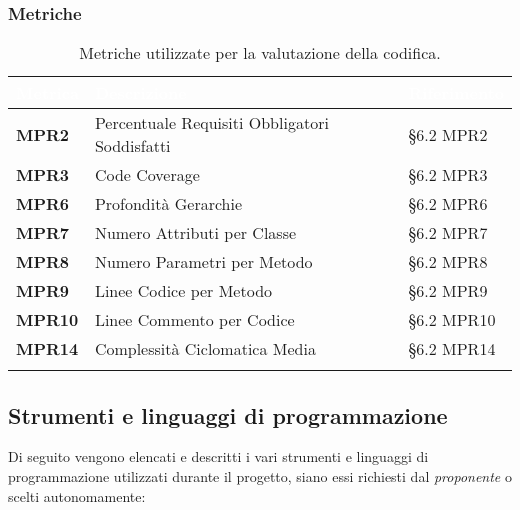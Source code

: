 \subsubsection{Metriche}
\setlength{\freewidth}{\dimexpr\textwidth-0\tabcolsep}
\renewcommand{\arraystretch}{1.5}
\setlength{\aboverulesep}{0pt}
\setlength{\belowrulesep}{0pt}
\begin{longtable}{L{.22\freewidth} L{.4\freewidth} L{.2\freewidth}}
	\toprule
	\textcolor{white}{\textbf{Metrica}}&
	\textcolor{white}{\textbf{Descrizione}}&	
	\textcolor{white}{\textbf{Riferimento}}\\
	\toprule
	\endhead
	
	\textbf{MPR2} & Percentuale Requisiti Obbligatori Soddisfatti & \S 6.2 MPR2 \\
	\textbf{MPR3} & Code Coverage & \S 6.2 MPR3 \\
	\textbf{MPR6} & Profondità Gerarchie &  \S6.2 MPR6 \\
	\textbf{MPR7} & Numero Attributi per Classe & \S 6.2 MPR7 \\
	\textbf{MPR8} & Numero Parametri per Metodo & \S 6.2 MPR8 \\
	\textbf{MPR9} & Linee Codice per Metodo & \S 6.2 MPR9 \\
	\textbf{MPR10} & Linee Commento per Codice & \S 6.2 MPR10 \\
	\textbf{MPR14} & Complessità Ciclomatica Media & \S 6.2 MPR14 \\

	\bottomrule
	\caption*{Metriche utilizzate per la valutazione della codifica.}
\end{longtable}

\subsection{Strumenti e linguaggi di programmazione}
Di seguito vengono elencati e descritti i vari strumenti e linguaggi di programmazione utilizzati durante il progetto, siano essi richiesti dal \emph{proponente} o scelti autonomamente:

